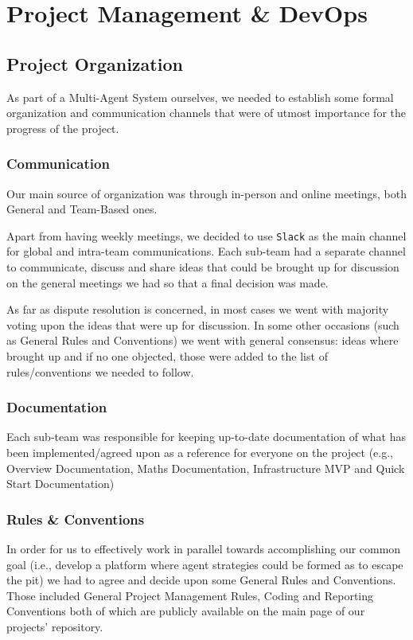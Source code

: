 \chapter{Project Management & DevOps}\label{DevOps}

\section{Project Organization}

As part of a Multi-Agent System ourselves, we needed to establish some formal organization and communication channels that were of utmost importance for the progress of the project.

\subsection{Communication}

Our main source of organization was through in-person and online meetings, both General and Team-Based ones.

Apart from having weekly meetings, we decided to use \texttt{Slack} as the main channel for global and intra-team communications.
Each sub-team had a separate channel to communicate, discuss and share ideas that could be brought up for discussion on the general meetings we had so that a final decision was made.

As far as dispute resolution is concerned, in most cases we went with majority voting upon the ideas that were up for discussion. In some other occasions (such as General Rules and Conventions) we went with general consensus: ideas where brought up and if no one objected, those were added to the list of rules/conventions we needed to follow.

\subsection{Documentation}

Each sub-team was responsible for keeping up-to-date documentation of what has been implemented/agreed upon as a reference for everyone on the project (e.g., Overview Documentation, Maths Documentation, Infrastructure MVP and Quick Start Documentation)

\subsection{Rules \& Conventions}

In order for us to effectively work in parallel towards accomplishing our common goal (i.e., develop a platform where agent strategies could be formed as to escape the pit) we had to agree and decide upon some General Rules and Conventions.
Those included General Project Management Rules, Coding and Reporting Conventions both of which are publicly available on the main page of our projects' repository.

